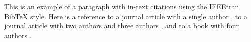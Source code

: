 \documentclass[a4paper,10pt]{article}
\begin{document}
This is an example of a paragraph with in-text
citations using the IEEEtran BibTeX style.
Here is a reference to a journal article with
a single author \cite{Recht2018ATO}, to a journal
article with two authors \cite{Recht2018ATO} and
three authors \cite{Recht2018ATO}, and to a book
with four authors \cite{Recht2018ATO}.



\end{document}
